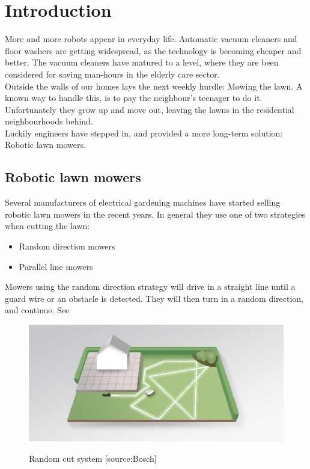 \chapter{Introduction}

More and more robots appear in everyday life. Automatic vacuum cleaners and floor washers are getting widespread, as the technology is becoming cheaper and better. The vacuum cleaners have matured to a level, where they are been considered for saving man-hours in the elderly care sector.\\

\noindent
Outside the walls of our homes lays the next weekly hurdle: Mowing the lawn. A known way to handle this, is to pay the neighbour's teenager to do it. Unfortunately they grow up and move out, leaving the lawns in the residential neighbourhoods behind.\\ 

\noindent
Luckily engineers have stepped in, and provided a more long-term solution: Robotic lawn mowers.

\section{Robotic lawn mowers}
Several manufacturers of electrical gardening machines have started selling robotic lawn mowers in the recent years. In general they use one of two strategies when cutting the lawn:
\begin{itemize}
	\item Random direction mowers
	\item Parallel line mowers
\end{itemize}

\noindent
Mowers using the random direction strategy will drive in a straight line until a guard wire or an obstacle is detected. They will then turn in a random direction, and continue. See 

\begin{figure}[H]
\centering
\includegraphics[scale=0.8]{figures/noLogiCut.jpg} 
\label{fig:randomcut}
\caption{Random cut system [source:Bosch]} 
\end{figure}

